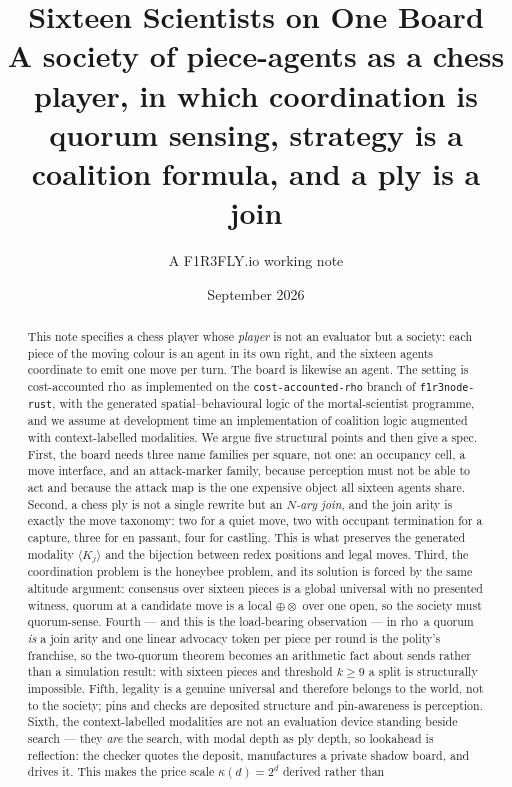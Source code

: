 \documentclass[11pt,a4paper]{article}
\title{\textbf{Sixteen Scientists on One Board}\\[0.4em]
\large A society of piece-agents as a chess player, in which coordination is\\
quorum sensing, strategy is a coalition formula, and a ply is a join}
\author{A F1R3FLY.io working note}
\date{September 2026}
\theoremstyle{plain}
\theoremstyle{definition}
\theoremstyle{remark}
\newcommand{\rhoc}{\textsf{rho}}
\newcommand{\Kmod}[1]{\langle K_{#1}\rangle}
\begin{document}
\maketitle

\begin{abstract}
This note specifies a chess player whose \emph{player} is not an evaluator but a
society: each piece of the moving colour is an agent in its own right, and the
sixteen agents coordinate to emit one move per turn. The board is likewise an
agent. The setting is cost-accounted \rhoc\ as implemented on the
\texttt{cost-accounted-rho} branch of \texttt{f1r3node-rust}, with the
generated spatial--behavioural logic of the mortal-scientist programme, and we
assume at development time an implementation of coalition logic augmented with
context-labelled modalities. We argue five structural points and then give a
spec. First, the board needs three name families per square, not one: an
occupancy cell, a move interface, and an attack-marker family, because
perception must not be able to act and because the attack map is the one
expensive object all sixteen agents share. Second, a chess ply is not a single
rewrite but an \emph{$N$-ary join}, and the join arity is exactly the move
taxonomy: two for a quiet move, two with occupant termination for a capture,
three for en passant, four for castling. This is what preserves the generated
modality $\Kmod{j}$ and the bijection between redex positions and legal moves.
Third, the coordination problem is the honeybee problem, and its solution is
forced by the same altitude argument: consensus over sixteen pieces is a global
universal with no presented witness, quorum at a candidate move is a local
$\oplus\otimes$ over one open, so the society must quorum-sense. Fourth --- and
this is the load-bearing observation --- in \rhoc\ a quorum \emph{is} a join
arity and one linear advocacy token per piece per round is the polity's
franchise, so the two-quorum theorem becomes an arithmetic fact about sends
rather than a simulation result: with sixteen pieces and threshold $k \geq 9$ a
split is structurally impossible. Fifth, legality is a genuine universal and
therefore belongs to the world, not to the society; pins and checks are
deposited structure and pin-awareness is perception. Sixth, the
context-labelled modalities are not an evaluation device standing beside search
--- they \emph{are} the search, with modal depth as ply depth, so lookahead is
reflection: the checker quotes the deposit, manufactures a private shadow board,
and drives it. This makes the price scale $\kappa(d) = 2^d$ derived rather than

\end{abstract}
\end{document}

